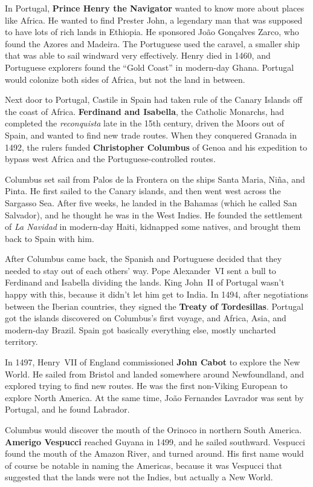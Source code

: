 In Portugal, \textbf{Prince Henry the Navigator} wanted to know more about places like Africa.
He wanted to find Prester John, a legendary man that was supposed to have lots of rich lands in Ethiopia.
He sponsored Jo\~ao Gon\c{c}alves Zarco, who found the Azores and Madeira.
The Portuguese used the caravel, a smaller ship that was able to sail windward very effectively.
Henry died in 1460, and Portuguese explorers found the ``Gold Coast'' in modern-day Ghana.
Portugal would colonize both sides of Africa, but not the land in between.

Next door to Portugal, Castile in Spain had taken rule of the Canary Islands off the coast of Africa.
\textbf{Ferdinand and Isabella}, the Catholic Monarchs, had completed the \textit{reconquista}
late in the 15th century, driven the Moors out of Spain, and wanted to find new trade routes.
When they conquered Granada in 1492, the rulers funded \textbf{Christopher Columbus} of Genoa
and his expedition to bypass west Africa and the Portuguese-controlled routes.

Columbus set sail from Palos de la Frontera on the ships Santa Maria, Ni\~na, and Pinta.
He first sailed to the Canary islands, and then went west across the Sargasso Sea.
After five weeks, he landed in the Bahamas (which he called San Salvador),
and he thought he was in the West Indies.
He founded the settlement of \textit{La Navidad} in modern-day Haiti,
kidnapped some natives, and brought them back to Spain with him.

After Columbus came back, the Spanish and Portuguese decided that they needed to stay out of each others' way.
Pope Alexander~VI sent a bull to Ferdinand and Isabella dividing the lands.
King John~II of Portugal wasn't happy with this, because it didn't let him get to India.
In 1494, after negotiations between the Iberian countries, they signed the \textbf{Treaty of Tordesillas}.
Portugal got the islands discovered on Columbus's first voyage, and Africa, Asia, and modern-day Brazil.
Spain got basically everything else, mostly uncharted territory.

In 1497, Henry~VII of England commissioned \textbf{John Cabot} to explore the New World.
He sailed from Bristol and landed somewhere around Newfoundland, and explored trying to find new routes.
He was the first non-Viking European to explore North America.
At the same time, Jo\~ao Fernandes Lavrador was sent by Portugal, and he found Labrador.

Columbus would discover the mouth of the Orinoco in northern South America.
\textbf{Amerigo Vespucci} reached Guyana in 1499, and he sailed southward.
Vespucci found the mouth of the Amazon River, and turned around.
His first name would of course be notable in naming the Americas,
because it was Vespucci that suggested that the lands were not the Indies, but actually a New World.

